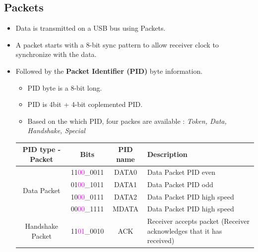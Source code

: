 \documentclass{article}
\begin{document}
\subsection{Packets}
\begin{itemize}
    \item Data is transmitted on a USB bus using Packets.
    \item A packet starts with a 8-bit sync pattern to allow receiver clock to synchronize with the data.
    \item Followed by the \textbf{Packet Identifier (PID)} byte information.
          \begin{itemize}
              \item PID byte is a 8-bit long.
              \item PID is 4bit + 4-bit coplemented PID.
              \item Based on the which PID, four packes are available : \textit{Token, Data, Handshake, Special}
          \end{itemize}
          \begin{table}[H]
              \centering
              \begin{tabular}{|c|c|c|p{9cm}|}
                  \hline
                  \textbf{PID type - Packet}        & \textbf{Bits}                   & \textbf{PID name} & \textbf{Description}                                                 \\
                  \hline
                  \multirow{4}{*}{Data Packet}      & 11\textcolor{magenta}{00}\_0011 & DATA0             & Data Packet PID even                                                 \\
                                                    & 01\textcolor{magenta}{00}\_1011 & DATA1             & Data Packet PID odd                                                  \\
                                                    & 10\textcolor{magenta}{00}\_0111 & DATA2             & Data Packet PID high speed                                           \\
                                                    & 00\textcolor{magenta}{00}\_1111 & MDATA             & Data Packet PID high speed                                           \\
                  \hline
                  \multirow{4}{*}{Handshake Packet} & 11\textcolor{magenta}{01}\_0010 & ACK               & Receiver accepts packet (Receiver acknowledges that it has received) \\

\end{tabular}
\end{table}
\end{itemize}
\end{document}
